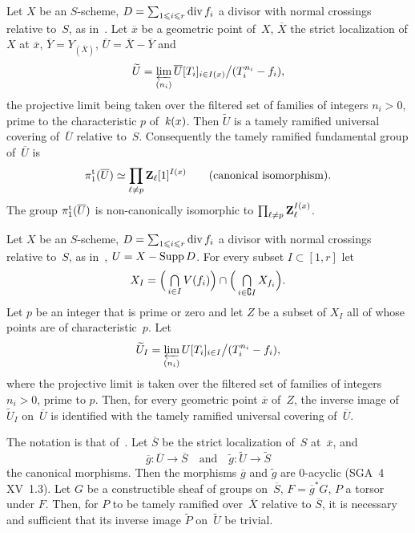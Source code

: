\begin{corollary}
\label{XIII.5.6}
Let $X$ be an $S$-scheme, $D=\sum_{1\leqslant i\leqslant
r}\operatorname{\mathrm{div}} f_{i}$ a divisor with normal crossings relative
to~$S$, as in~. Let $\overline{x}$ be a geometric
point of~$X$, $\overline{X}$ the strict localization of
$X$ at $\overline{x}$, $\overline{Y}=Y_{(\overline{X})}$,
$\overline{U}=\overline{X}-\overline{Y}$ and
$$
\widetilde{U}= \varprojlim_{(n_{i})}
\overline{U}[T_{i}]_{i\in I(x)}\big/ (T_{i}^{n_{i}}-f_{i}) ,
$$
the projective limit being taken over the filtered set of
families of integers $n_{i}>0$, prime to the characteristic
$p$ of~$\mathit{k}(x)$. Then $\widetilde{U}$ is a tamely ramified
universal covering of~$\overline{U}$ relative to~$S$. Consequently
the tamely ramified fundamental group
of~$\overline{U}$ is
$$
\pi_{1}^{\mathrm{t}}(\overline{U})\simeq \prod_{\ell\neq
p}\mathbf{Z}_{\ell}[1]^{I(x)} \qquad \textrm{(canonical isomorphism).}
$$
The group $\pi_{1}^{\mathrm{t}}(\overline{U})$ is non-canonically
isomorphic to $\prod_{\ell\neq p}\mathbf{Z}_{\ell}^{I(x)}$.
\end{corollary}

\begin{subremark}
\label{XIII.5.6.1}
Let $X$ be an $S$-scheme, $D=\sum_{1\leqslant i\leqslant
r}\operatorname{\mathrm{div}} f_{i}$ a divisor with normal crossings relative
to~$S$, as in~, $U=X-\operatorname{Supp} D$.
For every subset $I\subset[1,r]$ let
$$
X_{I}= \Big(\mathop{\textstyle\bigcap}\limits_{i\in I}V(f_{i})\Big) \cap \Big(\mathop{\textstyle\bigcap}\limits_{i\in\complement
I}X_{f_{i}}\Big) .
$$
Let $p$ be an integer that is prime or zero and let $Z$ be a subset of
$X_{I}$ all of whose points are of characteristic~$p$. Let
$$
\widetilde{U}_{I}= \varprojlim_{(n_{i})}
U[T_{i}]_{i\in I}
\big/ (T_{i}^{n_{i}}-f_{i}) ,
$$
where
the projective limit is taken over the filtered set of
families of integers $n_{i}>0$, prime to $p$. Then, for every
geometric point $\overline{x}$ of~$Z$, the inverse image of
$\widetilde{U}_{I}$ on~$\overline{U}$ is identified with the tamely
ramified universal covering of~$\overline{U}$.
\end{subremark}

\begin{corollary}
\label{XIII.5.7}
The notation is that of~. Let $\overline{S}$ be the
strict localization of~$S$ at~$\overline{x}$, and
$$
\overline{g}\colon\overline{U}\to\overline{S} \quad \text{and} \quad
\tilde{g}\colon\widetilde{U}\to\widetilde{S}
$$
the canonical morphisms. Then the morphisms $\overline{g}$ and
$\tilde g$ are $0$-acyclic \textup{(SGA~4 XV~1.3)}. Let $G$ be a
constructible sheaf of groups on~$\overline{S}$, $F=\overline{g}^*G$, $P$
a torsor under $F$. Then, for $P$ to be tamely
ramified over~$\overline{X}$ relative to $\overline{S}$, it
is necessary and sufficient that its inverse image $\widetilde{P}$ on~$\widetilde{U}$ be trivial.
\end{corollary}


